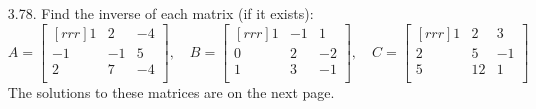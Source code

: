 \documentclass[12pt]{article}
\begin{document}
\begin{enumerate}
	
\item [3.78.] Find the inverse of each matrix (if it exists):\\
	\[	A= \begin{bmatrix}[rrr] 1 & 2 & -4\\ -1 & -1 & 5\\ 2 & 7 & -4\\ \end{bmatrix}, \quad
		B= \begin{bmatrix}[rrr] 1 & -1 & 1\\ 0 & 2 & -2\\ 1 & 3 & -1\\ \end{bmatrix}, \quad
		C= \begin{bmatrix}[rrr] 1 & 2 & 3\\ 2 & 5 & -1\\ 5 & 12 & 1\\ \end{bmatrix} \]
		The solutions to these matrices are on the next page.


\end{enumerate}
\end{document}
